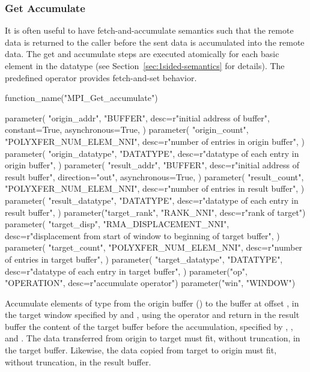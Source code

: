 \subsubsection{Get Accumulate}
\label{sec:1sided-getaccumulate}

It is often useful to have fetch-and-accumulate semantics such that
the remote data is returned to the caller before the sent data is
accumulated into the remote data.  The get and accumulate
steps are executed atomically for each basic element in the datatype
(see Section~\ref{sec:1sided-semantics} for details).
The predefined operator  provides fetch-and-set
behavior.

%
%
%
\begin{mpi-binding}
    function_name("MPI_Get_accumulate")
    
    parameter(
        "origin_addr",
        "BUFFER",
        desc=r"initial address of buffer",
        constant=True,
        asynchronous=True,
    )
    parameter(
        "origin_count",
        "POLYXFER_NUM_ELEM_NNI",
        desc=r"number of entries in origin buffer",
    )
    parameter(
        "origin_datatype",
        "DATATYPE",
        desc=r"datatype of each entry in origin buffer",
    )
    parameter(
        "result_addr",
        "BUFFER",
        desc=r"initial address of result buffer",
        direction="out",
        asynchronous=True,
    )
    parameter(
        "result_count",
        "POLYXFER_NUM_ELEM_NNI",
        desc=r"number of entries in result buffer",
    )
    parameter(
        "result_datatype",
        "DATATYPE",
        desc=r"datatype of each entry in result buffer",
    )
    parameter("target_rank", "RANK_NNI", desc=r"rank of target")
    parameter(
        "target_disp",
        "RMA_DISPLACEMENT_NNI",
        desc=r"displacement from start of window to beginning of target buffer",
    )
    parameter(
        "target_count",
        "POLYXFER_NUM_ELEM_NNI",
        desc=r"number of entries in target buffer",
    )
    parameter(
        "target_datatype",
        "DATATYPE",
        desc=r"datatype of each entry in target buffer",
    )
    parameter("op", "OPERATION", desc=r"accumulate operator")
    parameter("win", "WINDOW")
\end{mpi-binding}

Accumulate  elements of type  from 
the origin buffer () to the buffer at offset
, in the target window specified by
 and , using the operator 
and return in the result buffer  the content
of the target buffer before the accumulation, specified by
, , and
.
The data transferred from origin to target must fit, without
truncation, in the target buffer.  Likewise, the data copied from target to
origin must fit, without truncation, in the result buffer.

